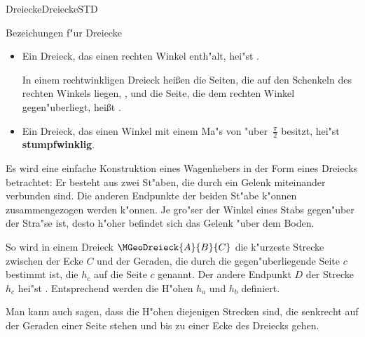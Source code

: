 \begin{MXContent}{Dreiecke}{Dreiecke}{STD}
\begin{MXInfo}{Bezeichungen f"ur Dreiecke}
\begin{itemize}
 \item Ein Dreieck, das einen rechten Winkel enth"alt, hei"st .
 
  In einem rechtwinkligen Dreieck hei\ss en die Seiten, die auf den Schenkeln des
  rechten Winkels liegen, ,
  und die Seite, die dem rechten Winkel gegen"uberliegt, hei\ss t
  .
       
 \item Ein Dreieck, das einen Winkel mit einem Ma"s von "uber~$\frac{\pi}{2}$
  besitzt, hei"st \textbf{stumpfwinklig}.
\end{itemize}
\end{MXInfo}

Es wird eine einfache Konstruktion eines Wagenhebers in der Form eines
Dreiecks betrachtet: Er besteht aus zwei St"aben, die durch ein Gelenk 
miteinander verbunden sind. Die anderen Endpunkte der beiden St"abe k"onnen
zusammengezogen werden k"onnen.
Je gro"ser der Winkel eines Stabs gegen"uber der Stra"se ist, desto 
h"oher befindet sich das Gelenk "uber dem Boden.
\begin{center}
\end{center}
So wird in einem Dreieck $\MGeoDreieck{A}{B}{C}$ die k"urzeste Strecke 
zwischen der Ecke $C$ und der Geraden, die durch die gegen"uberliegende 
Seite $c$ bestimmt ist, die 
 $h_c$ auf 
die Seite $c$ genannt. Der andere Endpunkt $D$ der Strecke $h_c$ hei"st 
.
Entsprechend werden die H"ohen $h_a$ und $h_b$ definiert.

Man kann auch sagen, dass die H"ohen diejenigen Strecken sind, die senkrecht 
auf der Geraden einer Seite stehen und bis zu einer Ecke des Dreiecks gehen.
\end{MXContent}


